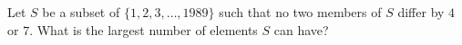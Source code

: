 Let $S$ be a subset of $\{1,2,3,\ldots,1989\}$ such that no two members of $S$ differ by $4$ or $7$. What is the largest number of elements $S$ can have?